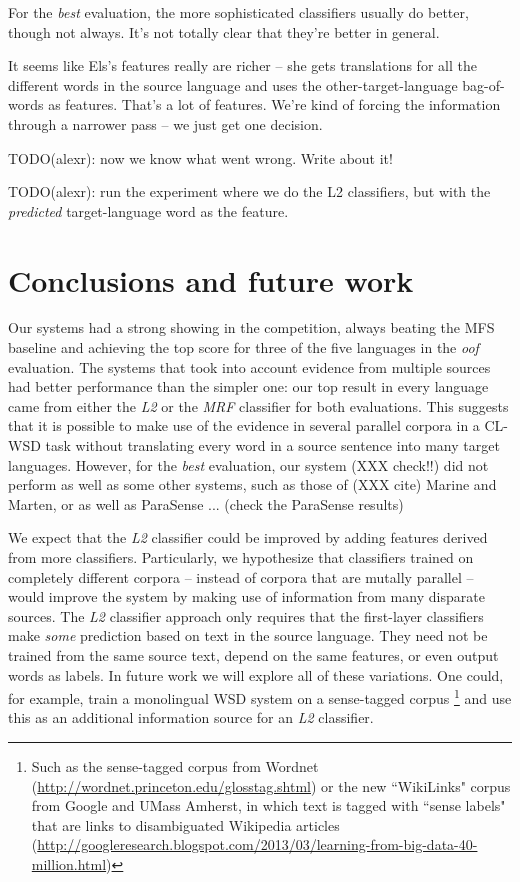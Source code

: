 \documentclass[11pt,letterpaper]{article}
\begin{document}
For the \emph{best} evaluation, the more sophisticated classifiers usually do
better, though not always. It's not totally clear that they're better in
general.

It seems like Els's features really are richer -- she gets translations for all
the different words in the source language and uses the other-target-language
bag-of-words as features. That's a lot of features. We're kind of forcing the
information through a narrower pass -- we just get one decision.

TODO(alexr): now we know what went wrong. Write about it!

TODO(alexr): run the experiment where we do the L2 classifiers, but with the
\emph{predicted} target-language word as the feature.

\section{Conclusions and future work}
Our systems had a strong showing in the competition, always beating the MFS
baseline and achieving the top score for three of the five languages in the
\emph{oof} evaluation. The systems that took into account evidence from
multiple sources had better performance than the simpler one: our top result in
every language came from either the \emph{L2} or the \emph{MRF} classifier for
both evaluations. This suggests that it is possible to make use of the evidence
in several parallel corpora in a CL-WSD task without translating every word in
a source sentence into many target languages. However, for the \emph{best}
evaluation, our system (XXX check!!) did not perform as well as some other
systems, such as those of (XXX cite) Marine and Marten, or as well as ParaSense
... (check the ParaSense results)


We expect that the \emph{L2} classifier could be improved by adding features
derived
from more classifiers. Particularly, we hypothesize that classifiers trained on
completely different corpora -- instead of corpora that are mutally parallel --
would improve the system by making use of information from many disparate
sources. The \emph{L2} classifier approach only requires that the first-layer
classifiers make \emph{some} prediction based on text in the source language.
They need not be trained from the same source text, depend on the same
features, or even output words as labels. In future work we will explore
all of these variations. One could, for example, train a monolingual WSD system
on a sense-tagged corpus \footnote{Such as the sense-tagged corpus from Wordnet
(\url{http://wordnet.princeton.edu/glosstag.shtml})
or the new ``WikiLinks" corpus from Google and UMass Amherst, in which text is
tagged with ``sense labels" that are links to disambiguated Wikipedia
articles
(\url{http://googleresearch.blogspot.com/2013/03/learning-from-big-data-40-million.html})}
and use this as an additional information source for an \emph{L2} classifier.
\end{document}
